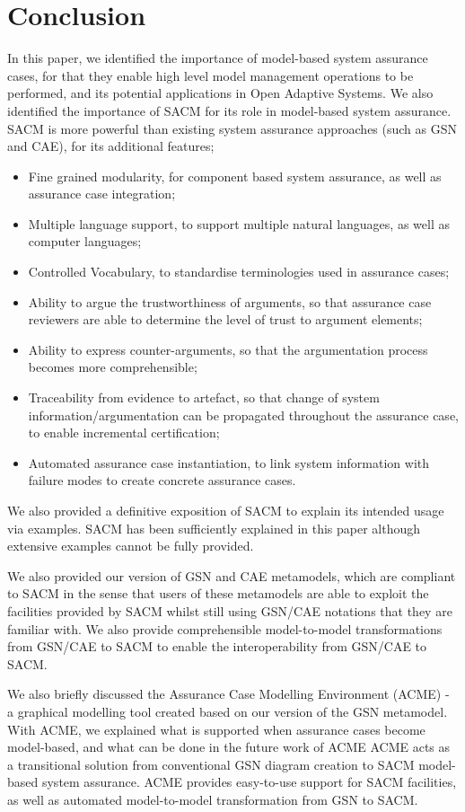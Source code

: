 \section{Conclusion}
\label{sec:conclusion}
In this paper, we identified the importance of model-based system assurance cases, for that they enable high level model management operations to be performed, and its potential applications in Open Adaptive Systems.
We also identified the importance of SACM for its role in model-based system assurance.
SACM is more powerful than existing system assurance approaches (such as GSN and CAE), for its additional features;
\begin{itemize}
	\item Fine grained modularity, for component based system assurance, as well as assurance case integration;
	\item Multiple language support, to support multiple natural languages, as well as computer languages;
	\item Controlled Vocabulary, to standardise terminologies used in assurance cases;
	\item Ability to argue the trustworthiness of arguments, so that assurance case reviewers are able to determine the level of trust to argument elements;
	\item Ability to express counter-arguments, so that the argumentation process becomes more comprehensible;
	\item Traceability from evidence to artefact, so that change of system information/argumentation can be propagated throughout the assurance case, to enable incremental certification;
	\item Automated assurance case instantiation, to link system information with failure modes to create concrete assurance cases.
\end{itemize}
We also provided a definitive exposition of SACM to explain its intended usage via examples. 
SACM has been sufficiently explained in this paper although extensive examples cannot be fully provided.

We also provided our version of GSN and CAE metamodels, which are compliant to SACM in the sense that users of these metamodels are able to exploit the facilities provided by SACM whilst still using GSN/CAE notations that they are familiar with. 
We also provide comprehensible model-to-model transformations from GSN/CAE to SACM to enable the interoperability from GSN/CAE to SACM. 

We also briefly discussed the Assurance Case Modelling Environment (ACME) - a graphical modelling tool created based on our version of the GSN metamodel. 
With ACME, we explained what is supported when assurance cases become model-based, and what can be done in the future work of ACME
ACME acts as a transitional solution from conventional GSN diagram creation to SACM model-based system assurance. ACME provides easy-to-use support for SACM facilities, as well as automated model-to-model transformation from GSN to SACM. 

